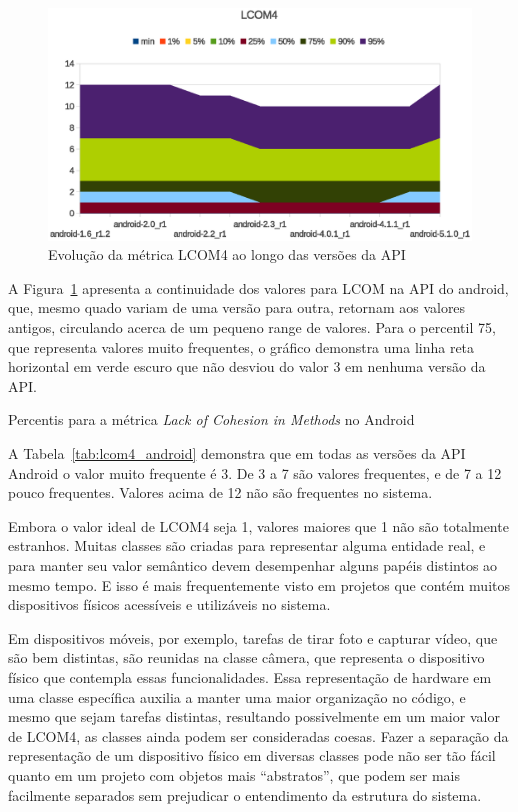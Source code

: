 \begin{figure}[!htb]
\centering
\includegraphics [keepaspectratio=true,scale=0.85]{figuras/graphs/lcom4_android.eps}
\caption{Evolução da métrica LCOM4 ao longo das versões da API}
\label{fig:lcom4_android}
\end{figure}

A Figura~\ref{fig:lcom4_android} apresenta a continuidade dos valores para LCOM na API do android, que, mesmo quado variam de uma versão para outra, retornam aos valores antigos, circulando acerca de um pequeno range de valores. Para o percentil 75, que representa valores muito frequentes, o gráfico demonstra uma linha reta horizontal em verde escuro que não desviou do valor 3 em nenhuma versão da API.

\begin{table}[!htb]
\centering
{}

\caption{Percentis para a métrica \textit{Lack of Cohesion in Methods} no Android}
\label{tab:lcom4_android}
\end{table}

A Tabela~\ref{tab:lcom4_android} demonstra que em todas as versões da API Android o valor muito frequente é 3. De 3 a 7 são valores frequentes, e de 7 a 12 pouco frequentes. Valores acima de 12 não são frequentes no sistema. 

Embora o valor ideal de LCOM4 seja 1, valores maiores que 1 não são totalmente estranhos. Muitas classes são criadas para representar alguma entidade real, e para manter seu valor semântico devem desempenhar alguns papéis distintos ao mesmo tempo. E isso é mais frequentemente visto em projetos que contém muitos dispositivos físicos acessíveis e utilizáveis no sistema. 

Em dispositivos móveis, por exemplo, tarefas de tirar foto e capturar vídeo, que são bem distintas, são reunidas na classe câmera, que representa o dispositivo físico que contempla essas funcionalidades. Essa representação de hardware em uma classe específica auxilia a manter uma maior organização no código, e mesmo que sejam tarefas distintas, resultando possivelmente em um maior valor de LCOM4, as classes ainda podem ser consideradas coesas. Fazer a separação da representação de um dispositivo físico em diversas classes pode não ser tão fácil quanto em um projeto com objetos mais ``abstratos'', que podem ser mais facilmente separados sem prejudicar o entendimento da estrutura do sistema.

